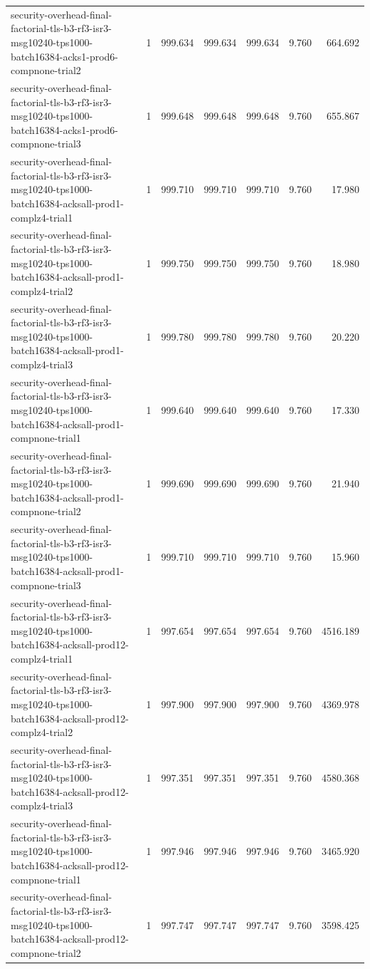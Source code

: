 \begin{tabular}{lrrrrrr}
security-overhead-final-factorial-tls-b3-rf3-isr3-msg10240-tps1000-batch16384-acks1-prod6-compnone-trial2 & 1 & 999.634 & 999.634 & 999.634 & 9.760 & 664.692 \\
security-overhead-final-factorial-tls-b3-rf3-isr3-msg10240-tps1000-batch16384-acks1-prod6-compnone-trial3 & 1 & 999.648 & 999.648 & 999.648 & 9.760 & 655.867 \\
security-overhead-final-factorial-tls-b3-rf3-isr3-msg10240-tps1000-batch16384-acksall-prod1-complz4-trial1 & 1 & 999.710 & 999.710 & 999.710 & 9.760 & 17.980 \\
security-overhead-final-factorial-tls-b3-rf3-isr3-msg10240-tps1000-batch16384-acksall-prod1-complz4-trial2 & 1 & 999.750 & 999.750 & 999.750 & 9.760 & 18.980 \\
security-overhead-final-factorial-tls-b3-rf3-isr3-msg10240-tps1000-batch16384-acksall-prod1-complz4-trial3 & 1 & 999.780 & 999.780 & 999.780 & 9.760 & 20.220 \\
security-overhead-final-factorial-tls-b3-rf3-isr3-msg10240-tps1000-batch16384-acksall-prod1-compnone-trial1 & 1 & 999.640 & 999.640 & 999.640 & 9.760 & 17.330 \\
security-overhead-final-factorial-tls-b3-rf3-isr3-msg10240-tps1000-batch16384-acksall-prod1-compnone-trial2 & 1 & 999.690 & 999.690 & 999.690 & 9.760 & 21.940 \\
security-overhead-final-factorial-tls-b3-rf3-isr3-msg10240-tps1000-batch16384-acksall-prod1-compnone-trial3 & 1 & 999.710 & 999.710 & 999.710 & 9.760 & 15.960 \\
security-overhead-final-factorial-tls-b3-rf3-isr3-msg10240-tps1000-batch16384-acksall-prod12-complz4-trial1 & 1 & 997.654 & 997.654 & 997.654 & 9.760 & 4516.189 \\
security-overhead-final-factorial-tls-b3-rf3-isr3-msg10240-tps1000-batch16384-acksall-prod12-complz4-trial2 & 1 & 997.900 & 997.900 & 997.900 & 9.760 & 4369.978 \\
security-overhead-final-factorial-tls-b3-rf3-isr3-msg10240-tps1000-batch16384-acksall-prod12-complz4-trial3 & 1 & 997.351 & 997.351 & 997.351 & 9.760 & 4580.368 \\
security-overhead-final-factorial-tls-b3-rf3-isr3-msg10240-tps1000-batch16384-acksall-prod12-compnone-trial1 & 1 & 997.946 & 997.946 & 997.946 & 9.760 & 3465.920 \\
security-overhead-final-factorial-tls-b3-rf3-isr3-msg10240-tps1000-batch16384-acksall-prod12-compnone-trial2 & 1 & 997.747 & 997.747 & 997.747 & 9.760 & 3598.425 \\

\end{tabular}
